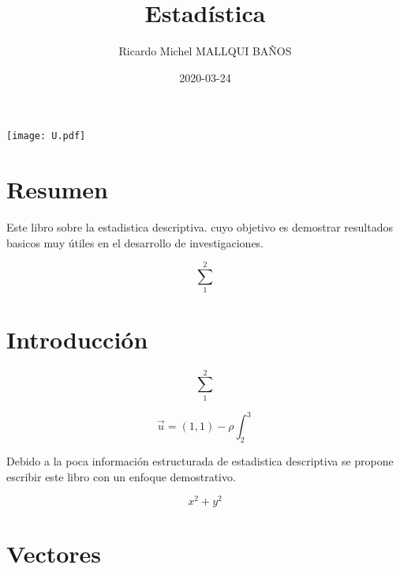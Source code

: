 \documentclass[10pt,]{krantz}
\title{Estadística}
\author{Ricardo Michel MALLQUI BAÑOS}
\institute{Universidad Nacional San Cristóbal De Huamanga}
\date{2020-03-24}
\let\oldincludegraphics\includegraphics
\renewcommand\includegraphics[2][]{%
  \oldincludegraphics[scale=0.85]{#2}
}
\theoremstyle{definition}
\theoremstyle{definition}
\theoremstyle{definition}
\theoremstyle{remark}
\begin{document}
\maketitle

\thispagestyle{empty}
\begin{center}
\texttt{[image: U.pdf]}
\end{center}


{
\hypersetup{linkcolor=}
\setcounter{tocdepth}{2}
\tableofcontents
}
\listoftables
\listoffigures
\newcommand{\N}{\mathbb{N}}
\newcommand{\R}{\mathbb{R}}
\newcommand{\CC}{\mathbb{C}}
\newcommand{\I}{\mathbb{I}}
\newcommand{\f}{\mathbb{f}}
\newcommand{\X}{\mathbb{X}}
\newcommand{\D}{\mathbb{D}}
\newcommand{\Z}{\mathbb{Z}}
\newcommand{\Q}{\mathbb{Q}}
\newcommand{\norm}[1]{\left\Vert#1\right\Vert}
\newcommand{\abs}[1]{\left\vert#1\right\vert}
\newcommand{\set}[1]{\left\{#1\right\}}
\newcommand{\seq}[1]{\left<#1\right>}
\newcommand{\co}[1]{\left[#1\right]}
\newcommand{\cc}[1]{\left(#1\right)}
\newcommand{\J}{\mathcal{J}}
\newcommand{\K}{\mathcal{K}}
\newcommand{\M}{\mathcal{M}}
\newcommand{\F}{\mathcal{F}}

\hypertarget{resumen}{%
\chapter*{Resumen}\label{resumen}}


Este libro sobre la estadistica descriptiva. cuyo objetivo es demostrar resultados basicos muy útiles en el desarrollo de investigaciones.

\[\sum_1^2\]

\hypertarget{introducciuxf3n}{%
\chapter*{Introducción}\label{introducciuxf3n}}


\[\sum_1^2\]

\[\vec{u}=(1,1)-\rho\int_2^3\]

Debido a la poca información estructurada de estadistica descriptiva se propone escribir este libro con un enfoque demostrativo.

\[x^2+y^2\]

\mainmatter

\hypertarget{vectores}{%
\chapter{Vectores}\label{vectores}}
\end{document}
